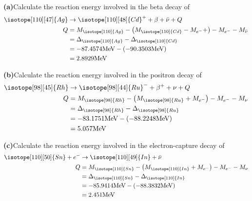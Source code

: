 \documentclass[11pt]{article}
\renewcommand{\part}[1] {\vspace{.10in} {\bf (#1)}}
\newcommand{\iso}{\isotope}
\begin{document}
\part{a}{Calculate the reaction energy involved in the beta decay of \iso[110]{Ag}}
\begin{align}
	\iso[110][47]{Ag} &\to \iso[110][48]{Cd}^{+} +\beta +\bar{\nu} + Q \notag\\
	Q &= M_{\iso[110]{Ag}} - \left (M_{\iso[110]{Cd}} - M_{e^{-}} + \right ) - M_{e^{-}} - M_{\bar{\nu}} \notag\\
	  &= \Delta_{\iso[110]{Ag}} -\Delta_{\iso[110]{Cd}} \notag \\
	  &= -87.4574 \text{MeV} - \left ( -90.3503 \text{MeV} \right) \notag \\
	  &= 2.8929\text{MeV}
\end{align}

\part{b}{Calculate the reaction energy involved in the positron decay of \iso[98]{Rh}}
\begin{align}
	\iso[98][45]{Rh} &\to \iso[98][44]{Ru}^{-} + \beta^{+} + \nu + Q \notag \\
	Q &= M_{\iso[98]{Rh}} - \left ( M_{\iso[98]{Ru}} + M_{e^{-}} \right ) - M_{e^{-}} -M_{\nu} \notag \\
	  &= \Delta_{\iso[98]{Rh}} - \Delta_{\iso[98]{Ru}} \notag \\
	  &= -83.1751\text{MeV} - \left ( -88.2248\text{MeV} \right ) \notag \\
	  &= 5.057 \text{MeV}
\end{align}

\part{c}{Calculate the reaction energy involved in the electron-capture decay of \iso[111]{Sn}}
\begin{align}
	\iso[110][50]{Sn} + e^{-} &\to \iso[110][49]{In} + \bar{\nu} \notag \\
	Q &= M_{\iso[110]{Sn}} - \left (M_{\iso[110]{In}} + M_{e^{-}} \right ) - M_{e^{-}} -M_{\nu} \notag \\
	  &= \Delta_{\iso[110]{Sn}} - \Delta_{\iso[110]{In}} \notag \\
	  &= -85.9414\text{MeV} - \left (-88.3832\text{MeV} \right ) \notag \\
	  &= 2.451\text{MeV}
\end{align}
\end{document}

